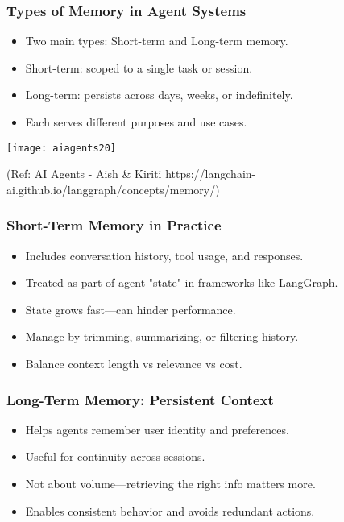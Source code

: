 \begin{frame}[fragile]\frametitle{Types of Memory in Agent Systems}

		\begin{itemize}
		  \item Two main types: Short-term and Long-term memory.
		  \item Short-term: scoped to a single task or session.
		  \item Long-term: persists across days, weeks, or indefinitely.
		  \item Each serves different purposes and use cases.
		\end{itemize}

		\begin{center}
		\texttt{[image: aiagents20]}

		{\tiny (Ref: AI Agents - Aish \& Kiriti https://langchain-ai.github.io/langgraph/concepts/memory/)}

		\end{center}



\end{frame}

\begin{frame}[fragile]\frametitle{Short-Term Memory in Practice}
\begin{itemize}
  \item Includes conversation history, tool usage, and responses.
  \item Treated as part of agent "state" in frameworks like LangGraph.
  \item State grows fast—can hinder performance.
  \item Manage by trimming, summarizing, or filtering history.
  \item Balance context length vs relevance vs cost.
\end{itemize}
\end{frame}

\begin{frame}[fragile]\frametitle{Long-Term Memory: Persistent Context}
\begin{itemize}
  \item Helps agents remember user identity and preferences.
  \item Useful for continuity across sessions.
  \item Not about volume—retrieving the right info matters more.
  \item Enables consistent behavior and avoids redundant actions.
\end{itemize}
\end{frame}

